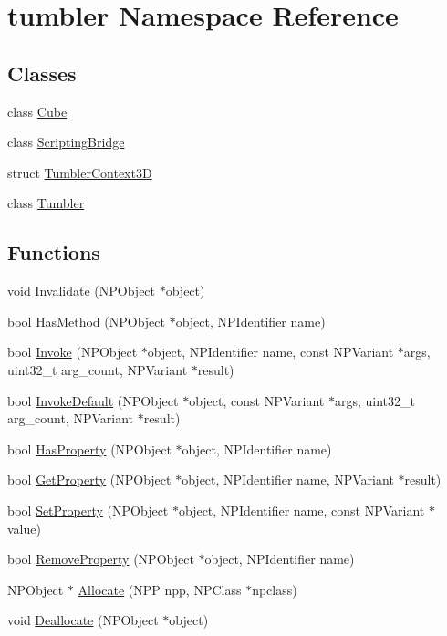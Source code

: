 \hypertarget{namespacetumbler}{
\section{tumbler Namespace Reference}
\label{namespacetumbler}
}
\subsection*{Classes}
\begin{DoxyCompactItemize}
\item 
class \hyperlink{classtumbler_1_1_cube}{Cube}
\item 
class \hyperlink{classtumbler_1_1_scripting_bridge}{ScriptingBridge}
\item 
struct \hyperlink{structtumbler_1_1_tumbler_context3_d}{TumblerContext3D}
\item 
class \hyperlink{classtumbler_1_1_tumbler}{Tumbler}
\end{DoxyCompactItemize}
\subsection*{Functions}
\begin{DoxyCompactItemize}
\item 
void \hyperlink{namespacetumbler_ab219f1f08239d2675431fd3e3299b71d}{Invalidate} (NPObject $\ast$object)
\item 
bool \hyperlink{namespacetumbler_a0440bebe4c3872dbed8390142035d1d1}{HasMethod} (NPObject $\ast$object, NPIdentifier name)
\item 
bool \hyperlink{namespacetumbler_a1336a275c5d007684384b01b032dec56}{Invoke} (NPObject $\ast$object, NPIdentifier name, const NPVariant $\ast$args, uint32\_\-t arg\_\-count, NPVariant $\ast$result)
\item 
bool \hyperlink{namespacetumbler_a35b1cc267fcf3e0beed6b9e45caa65ef}{InvokeDefault} (NPObject $\ast$object, const NPVariant $\ast$args, uint32\_\-t arg\_\-count, NPVariant $\ast$result)
\item 
bool \hyperlink{namespacetumbler_a2f2417690297eb874bfa76c0d125a64e}{HasProperty} (NPObject $\ast$object, NPIdentifier name)
\item 
bool \hyperlink{namespacetumbler_a41d6ba518f6ce31f8fafc12eb9dd044c}{GetProperty} (NPObject $\ast$object, NPIdentifier name, NPVariant $\ast$result)
\item 
bool \hyperlink{namespacetumbler_a036219547d706a1d483feb048bcacc00}{SetProperty} (NPObject $\ast$object, NPIdentifier name, const NPVariant $\ast$value)
\item 
bool \hyperlink{namespacetumbler_a4b3edf30d857d6821ff31c7676cae983}{RemoveProperty} (NPObject $\ast$object, NPIdentifier name)
\item 
NPObject $\ast$ \hyperlink{namespacetumbler_a133c46b3658a35f597bf5806a58c433e}{Allocate} (NPP npp, NPClass $\ast$npclass)
\item 
void \hyperlink{namespacetumbler_a6e665bba23bf978176f39f24fd07d501}{Deallocate} (NPObject $\ast$object)
\end{DoxyCompactItemize}


